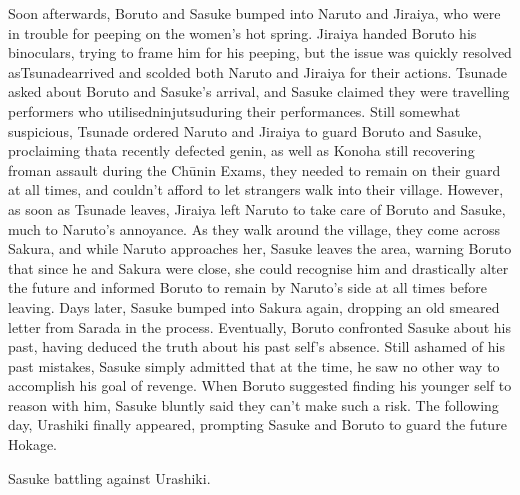 \documentclass[a4paper,12pt]{article}
\begin{document}
Soon afterwards, Boruto and Sasuke bumped into Naruto and Jiraiya, who were in trouble for peeping on the women's hot spring. Jiraiya handed Boruto his binoculars, trying to frame him for his peeping, but the issue was quickly resolved asTsunadearrived and scolded both Naruto and Jiraiya for their actions. Tsunade asked about Boruto and Sasuke's arrival, and Sasuke claimed they were travelling performers who utilisedninjutsuduring their performances. Still somewhat suspicious, Tsunade ordered Naruto and Jiraiya to guard Boruto and Sasuke, proclaiming thata recently defected genin, as well as Konoha still recovering froman assault during the Chūnin Exams, they needed to remain on their guard at all times, and couldn't afford to let strangers walk into their village. However, as soon as Tsunade leaves, Jiraiya left Naruto to take care of Boruto and Sasuke, much to Naruto's annoyance. As they walk around the village, they come across Sakura, and while Naruto approaches her, Sasuke leaves the area, warning Boruto that since he and Sakura were close, she could recognise him and drastically alter the future and informed Boruto to remain by Naruto's side at all times before leaving. Days later, Sasuke bumped into Sakura again, dropping an old smeared letter from Sarada in the process. Eventually, Boruto confronted Sasuke about his past, having deduced the truth about his past self's absence. Still ashamed of his past mistakes, Sasuke simply admitted that at the time, he saw no other way to accomplish his goal of revenge. When Boruto suggested finding his younger self to reason with him, Sasuke bluntly said they can't make such a risk. The following day, Urashiki finally appeared, prompting Sasuke and Boruto to guard the future Hokage.\\ \par \vspace{0.5cm}

Sasuke battling against Urashiki.\\ \par \vspace{0.5cm}
\end{document}
